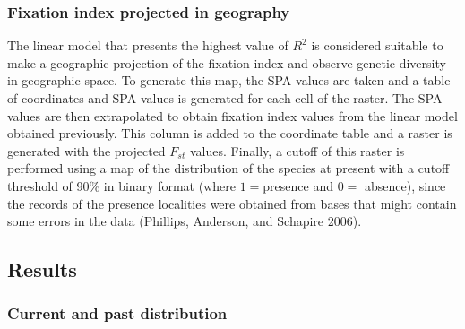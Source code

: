 \documentclass[
]{article}
\begin{document}
\hypertarget{fixation-index-projected-in-geography}{%
\subsubsection{Fixation index projected in
geography}\label{fixation-index-projected-in-geography}}

The linear model that presents the highest value of \(R^2\) is
considered suitable to make a geographic projection of the fixation
index and observe genetic diversity in geographic space. To generate
this map, the SPA values are taken and a table of coordinates and SPA
values is generated for each cell of the raster. The SPA values are then
extrapolated to obtain fixation index values from the linear model
obtained previously. This column is added to the coordinate table and a
raster is generated with the projected \(F_{st}\) values. Finally, a
cutoff of this raster is performed using a map of the distribution of
the species at present with a cutoff threshold of 90\% in binary format
(where \(1 =\)presence and \(0 =\) absence), since the records of the
presence localities were obtained from bases that might contain some
errors in the data (Phillips, Anderson, and Schapire 2006).

\hypertarget{results}{%
\subsection{Results}\label{results}}

\hypertarget{current-and-past-distribution}{%
\subsubsection{Current and past
distribution}\label{current-and-past-distribution}}
\end{document}
